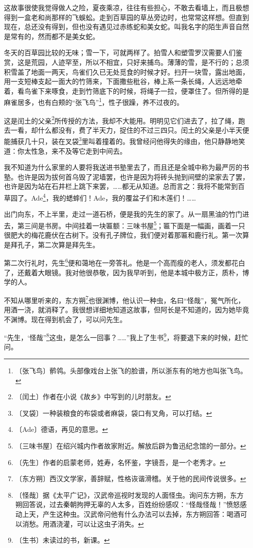 \documentclass[12pt,UTF-8,openany]{ctexbook}
\begin{document}
\begin{large}
    这故事很使我觉得做人之险，夏夜乘凉，往往有些担心，不敢去看墙上，而且极想得到一盒老和尚那样的飞蜈蚣。走到百草园的草丛旁边时，也常常这样想。但直到现在，总还没有得到，但也没有遇见过赤练蛇和美女蛇。叫我名字的陌生声音自然是常有的，然而都不是美女蛇。
    
    冬天的百草园比较的无味；雪一下，可就两样了。拍雪人和塑雪罗汉需要人们鉴赏，这是荒园，人迹罕至，所以不相宜，只好来捕鸟。薄薄的雪，是不行的；总须积雪盖了地面一两天，鸟雀们久已无处觅食的时候才好。扫开一块雪，露出地面，用一支短棒支起一面大的竹筛来，下面撒些秕谷，棒上系一条长绳，人远远地牵着，看鸟雀下来啄食，走到竹筛底下的时候，将绳子一拉，便罩住了。但所得的是麻雀居多，也有白颊的“张飞鸟”\footnote{〔张飞鸟〕鹡鸰。头部像戏台上张飞的脸谱，所以浙东有的地方也叫张飞鸟。}，性子很躁，养不过夜的。
    
    这是闰土的父亲\footnote{〔闰土〕作者在小说《故乡》中写到的儿时朋友。}所传授的方法，我却不大能用。明明见它们进去了，拉了绳，跑去一看，却什么都没有，费了半天力，捉住的不过三四只。闰土的父亲是小半天便能捕获几十只，装在叉袋\footnote{〔叉袋〕一种装粮食的布袋或者麻袋，袋口有叉角，可以打结。}里叫着撞着的。我曾经问他得失的缘由，他只静静地笑道：你太性急，来不及等它走到中间去。
    
    我不知道为什么家里的人要将我送进书塾里去了，而且还是全城中称为最严厉的书塾。也许是因为拔何首乌毁了泥墙罢，也许是因为将砖头抛到间壁的梁家去了罢，也许是因为站在石井栏上跳下来罢，……都无从知道。总而言之：我将不能常到百草园了。Ade\footnote{〔Ade〕德语，再见的意思。}，我的蟋蟀们！Ade，我的覆盆子们和木莲们！……
    
    出门向东，不上半里，走过一道石桥，便是我的先生的家了。从一扇黑油的竹门进去，第三间是书房。中间挂着一块匾额：三味书屋\footnote{〔三味书屋〕在绍兴城内作者故家附近。解放后辟为鲁迅纪念馆的一部分。}；匾下面是一幅画，画着一只很肥大的梅花鹿伏在古树下。没有孔子牌位，我们便对着那匾和鹿行礼。第一次算是拜孔子，第二次算是拜先生。
    
    第二次行礼时，先生\footnote{〔先生〕作者的启蒙老师，姓寿，名怀鉴，字镜吾，是一个老秀才。}便和蔼地在一旁答礼。他是一个高而瘦的老人，须发都花白了，还戴着大眼镜。我对他很恭敬，因为我早听到，他是本城中极方正，质朴，博学的人。
    
    不知从哪里听来的，东方朔\footnote{〔东方朔〕西汉文学家，善辞赋，性格诙谐滑稽。关于他的民间传说很多。}也很渊博，他认识一种虫，名曰“怪哉”，冤气所化，用酒一浇，就消释了。我很想详细地知道这故事，但阿长是不知道的，因为她毕竟不渊博。现在得到机会了，可以问先生。
    
    “先生，‘怪哉”\footnote{〔怪哉〕据《太平广记》，汉武帝巡视时发现的人面怪虫。询问东方朔，东方朔回答说，过去秦朝拘押无辜的人太多，百姓纷纷感叹：“怪哉怪哉！”愤怒感动上天，产生这种虫。汉武帝问他有什么办法可以去掉，东方朔回答：喝酒可以消愁。用酒浇灌，可以让这虫子消失。}这虫，是怎么一回事？……”我上了生书\footnote{〔生书〕未读过的书，新课。}，将要退下来的时候，赶忙问。
    

\end{large}
\end{document}
